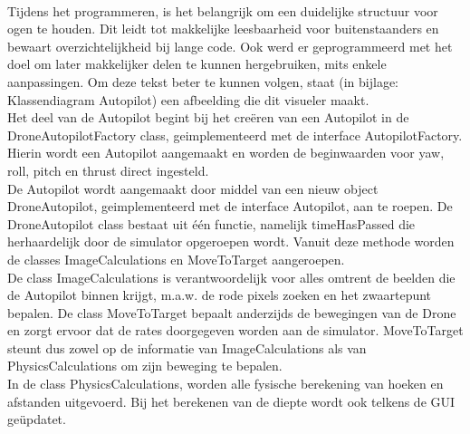 \\
Tijdens het programmeren, is het belangrijk om een duidelijke structuur voor ogen te houden. Dit leidt tot makkelijke leesbaarheid voor buitenstaanders en bewaart overzichtelijkheid bij lange code. Ook werd er geprogrammeerd met het doel om later makkelijker delen te kunnen hergebruiken, mits enkele aanpassingen. Om deze tekst beter te kunnen volgen, staat (in bijlage: Klassendiagram Autopilot) een afbeelding die dit visueler maakt.
\\

Het deel van de Autopilot begint bij het cre\"eren van een Autopilot in de DroneAutopilotFactory class, geimplementeerd met de interface AutopilotFactory. Hierin wordt een Autopilot aangemaakt en worden de beginwaarden voor yaw, roll, pitch en thrust direct ingesteld.
\\

De Autopilot wordt aangemaakt door middel van een nieuw object DroneAutopilot, geimplementeerd met de interface Autopilot, aan te roepen. De DroneAutopilot class bestaat uit één functie, namelijk timeHasPassed die herhaardelijk door de simulator opgeroepen wordt. Vanuit deze methode worden de classes ImageCalculations en MoveToTarget aangeroepen. 
\\

De class ImageCalculations is verantwoordelijk voor alles omtrent de beelden die de Autopilot binnen krijgt, m.a.w. de rode pixels zoeken en het zwaartepunt bepalen. De class MoveToTarget bepaalt anderzijds de bewegingen van de Drone en zorgt ervoor dat de rates doorgegeven worden aan de simulator. MoveToTarget steunt dus zowel op de informatie van ImageCalculations als van PhysicsCalculations om zijn beweging te bepalen. 
\\

In de class PhysicsCalculations, worden alle fysische berekening van hoeken en afstanden uitgevoerd. Bij het berekenen van de diepte wordt ook telkens de GUI ge\"updatet.